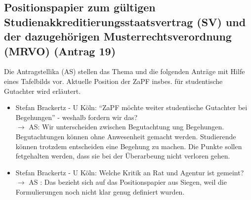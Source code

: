   \subsection{Positionspapier zum gültigen Studienakkreditierungsstaatsvertrag (SV) und der dazugehörigen Musterrechtsverordnung (MRVO) (Antrag 19)}
    Die Antragstellika (AS) stellen das Thema und die folgenden Anträge mit Hilfe eines Tafelbilds vor.
    Aktuelle Position der ZaPF insbes. für studentische Gutachter wird erläutert.

    \begin{itemize}
      \item Stefan Brackertz - U Köln:  ``ZaPF möchte weiter studentische Gutachter bei Begehungen'' - weshalb fordern wir das? \\
        $\rightarrow$ AS: Wir unterscheiden zwischen Begutachtung ung Begehungen. Begutachtungen können ohne Anwesenheit gemacht werden. Studierende können trotzdem entscheiden eine Begehung zu machen. Die Punkte sollen fetgehalten werden, dass sie bei der Überarbeung nicht verloren gehen.

      \item Stefan Brackertz - U Köln:  Welche Kritik an Rat und Agentur ist gemeint? \\
        $\rightarrow$ AS : Das bezieht sich auf das Positionspapier aus Siegen, weil die Formulierungen noch nicht klar genug definiert wurden.


\end{itemize}
